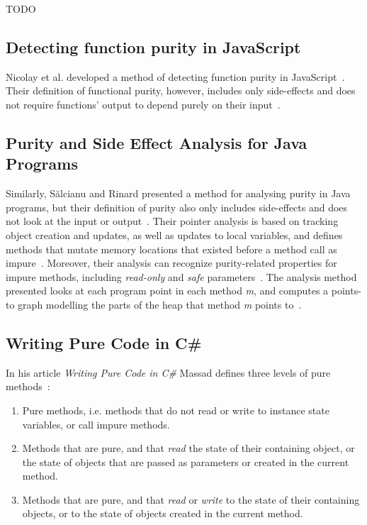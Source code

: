 \documentclass[a4paper,12pt]{article}
\begin{document}
TODO


\subsection{Detecting function purity in JavaScript}
Nicolay et al. developed a method of detecting function purity in JavaScript~\cite{purity-in-javascript}. Their definition of functional purity, however, includes only side-effects and does not require functions' output to depend purely on their input~\cite{purity-in-javascript}.


\subsection{Purity and Side Effect Analysis for Java Programs} \label{sub:Purity and Side Effect Analysis for Java Programs}
Similarly, S\u{a}lcianu and Rinard presented a method for analysing purity in Java programs, but their definition of purity also only includes side-effects and does not look at the input or output~\cite{salcianu}. Their pointer analysis is based on tracking object creation and updates, as well as updates to local variables, and defines methods that mutate memory locations that existed before a method call as impure~\cite{salcianu}. Moreover, their analysis can recognize purity-related properties for impure methods, including \textit{read-only} and \textit{safe} parameters~\cite{salcianu}. The analysis method presented looks at each program point in each method \textit{m}, and computes a points-to graph modelling the parts of the heap that method \textit{m} points to~\cite{salcianu}.

\subsection{Writing Pure Code in C\#} \label{sub:Writing Pure Code in Cs}
In his article \textit{Writing Pure Code in C\#} Massad defines three levels of pure methods~\cite{yacoub-massad-pure-code}:
\begin{enumerate}
  \item Pure methods, i.e. methods that do not read or write to instance state variables, or call impure methods.
  \item Methods that are pure, and that \textit{read} the state of their containing object, or the state of objects that are passed as parameters or created in the current method.
  \item Methods that are pure, and that \textit{read} or \textit{write} to the state of their containing objects, or to the state of objects created in the current method.
\end{enumerate}
\end{document}
